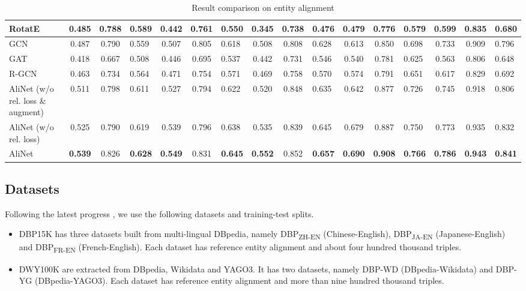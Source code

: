 \documentclass[letterpaper]{article} \usepackage{aaai20}  \usepackage{times}  \usepackage{helvet} \usepackage{courier}  \usepackage[hyphens]{url}  \usepackage{graphicx} \urlstyle{rm} \def\UrlFont{\rm}  \frenchspacing  \setlength{\pdfpagewidth}{8.5in}  \setlength{\pdfpageheight}{11in}  \usepackage{amsmath}
\begin{document}
\begin{table*}[!t]
{\begin{tabular}{lcclcclcclcclccl}
				RotatE \cite{RotatE} & 0.485 & 0.788 & 0.589 & 0.442 & 0.761 & 0.550 & 0.345 & 0.738 & 0.476 & 0.479 & 0.776 & 0.579 & 0.599 & 0.835 & 0.680\\
				\midrule
				GCN \cite{GCN} & 0.487 & 0.790 & 0.559 & 0.507 & 0.805 & 0.618 & 0.508 & 0.808 & 0.628 & 0.613 & 0.850 & 0.698 & 0.733 & 0.909 & 0.796\\
				GAT \cite{GAT} & 0.418 & 0.667 & 0.508 & 0.446 & 0.695 & 0.537 & 0.442 & 0.731 & 0.546 & 0.540 & 0.781 & 0.625 & 0.563 & 0.806 & 0.648 \\
				R-GCN \cite{R-GCN} & 0.463 & 0.734 & 0.564 & 0.471 & 0.754 & 0.571 & 0.469 & 0.758 & 0.570 & 0.574 & 0.791 & 0.651 & 0.617 & 0.829 & 0.692\\
				\midrule
				AliNet (w/o rel. loss \& augment) & 0.511 & 0.798 & 0.611 & 0.527 & 0.794 & 0.622 & 0.520 & 0.848 & 0.635 & 0.642 & 0.877 & 0.726 & 0.745 & 0.918 & 0.806\\
				AliNet (w/o rel. loss) & 0.525 & 0.790 & 0.619 & 0.539 & 0.796 & 0.638 & 0.535 & 0.839 & 0.645 & 0.679 & 0.887 & 0.750 & 0.773 & 0.935 & 0.832\\
								AliNet & \textbf{0.539} & 0.826 & \textbf{0.628} & \textbf{0.549} & 0.831 & \textbf{0.645} & \textbf{0.552} & 0.852 & \textbf{0.657} & \textbf{0.690} & \textbf{0.908} & \textbf{0.766} & \textbf{0.786} & \textbf{0.943} & \textbf{0.841}\\
				\bottomrule
			\end{tabular}}
			\caption{Result comparison on entity alignment}
	\label{tab:ent_alignment}
\end{table*}

\subsection{Datasets}
Following the latest progress \cite{BootEA,MuGNN}, we use the following datasets and training-test splits.
\begin{itemize} 
	\item DBP15K \cite{JAPE} has three datasets built from multi-lingual DBpedia, namely DBP\textsubscript{ZH-EN} (Chinese-English), DBP\textsubscript{JA-EN} (Japanese-English) and DBP\textsubscript{FR-EN} (French-English). Each dataset has  reference entity alignment and about four hundred thousand triples.
	\item DWY100K \cite{BootEA} are extracted from DBpedia, Wikidata and YAGO3. It has two datasets, namely DBP-WD (DBpedia-Wikidata) and DBP-YG (DBpedia-YAGO3). Each dataset has  reference entity alignment and more than nine hundred thousand triples.
\end{itemize}  
\end{document}

